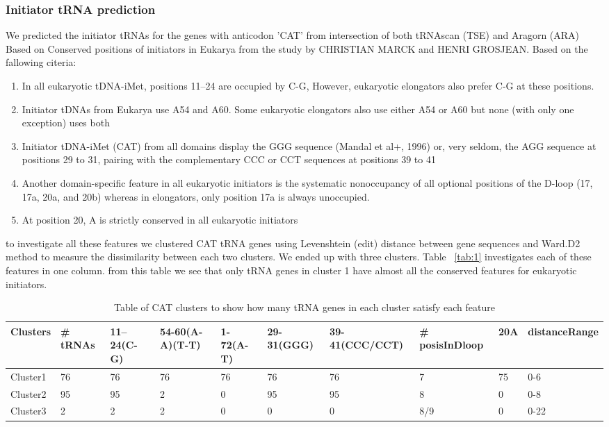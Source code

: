 \documentclass[
10pt, %
a4paper, %
oneside, %
headinclude,footinclude, %
BCOR5mm, %
]{scrartcl}
\begin{document}
\subsubsection*{Initiator tRNA prediction}
We predicted the initiator tRNAs for the genes with anticodon 'CAT' from intersection of both tRNAscan (TSE) and Aragorn (ARA) Based on Conserved positions of initiators in Eukarya from the study by CHRISTIAN MARCK and HENRI GROSJEAN. Based on the fallowing citeria:
\begin{enumerate}[noitemsep] %
\item In all eukaryotic tDNA-iMet, positions 11–24 are occupied by C-G, However, eukaryotic elongators
also prefer C-G at these positions.

\item Initiator tDNAs from Eukarya use A54 and A60. Some eukaryotic elongators also use either A54 or
A60 but none (with only one exception) uses both

\item Initiator tDNA-iMet (CAT) from all domains display the GGG sequence (Mandal et al+, 1996) or,
very seldom, the AGG sequence at positions 29 to 31, pairing with the complementary CCC or
CCT sequences at positions 39 to 41

\item Another domain-specific feature in all eukaryotic initiators is the systematic nonoccupancy of all
optional positions of the D-loop (17, 17a, 20a, and 20b) whereas in elongators, only position 17a is always unoccupied.

\item At position 20, A is strictly conserved in all eukaryotic initiators
\end{enumerate} 
to investigate all these features we clustered CAT tRNA genes using Levenshtein (edit) distance between gene sequences and Ward.D2 method to measure the dissimilarity between each two clusters. We ended up with three clusters. Table ~\vref{tab:1} investigates each of these features in one column. from this table we see that only tRNA genes in cluster 1 have almost all the conserved features for eukaryotic initiators.


\begin{table}[hbt]
\caption{Table of CAT clusters to show how many tRNA genes in each cluster satisfy each feature}
\begin{adjustbox}{width=\columnwidth,center}
\begin{tabular}{|l|lllllllll|}
\hline
Clusters & \# tRNAs & 11–24(C-G) & 54-60(A-A)(T-T) & 1-72(A-T) & 29-31(GGG) & 39-41(CCC/CCT) & \#  posisInDloop & 20A & distanceRange \\
\hline
Cluster1 & 76 & 76 & 76 & 76 & 76 & 76 & 7 & 75 & 0-6\\
Cluster2 & 95 & 95 & 2 & 0 & 95 & 95 & 8 & 0 & 0-8\\
Cluster3 & 2 & 2 & 2 & 0 & 0 & 0 & 8/9 & 0 & 0-22\\
\hline
\end{tabular}
\label{tab:1}
\end{adjustbox}
\end{table}
\end{document}

